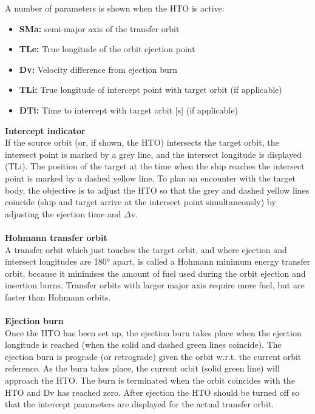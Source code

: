 \documentclass[Orbiter User Manual.tex]{subfiles}
\begin{document}
A number of parameters is shown when the HTO is active:
\begin{itemize}
\item \textbf{SMa:} semi-major axis of the transfer orbit
\item \textbf{TLe:} True longitude of the orbit ejection point
\item \textbf{Dv:} Velocity difference from ejection burn
\item \textbf{TLi:} True longitude of intercept point with target orbit (if applicable)
\item \textbf{DTi:} Time to intercept with target orbit [s] (if applicable)
\end{itemize}

\noindent
\textbf{Intercept indicator}\\
If the source orbit (or, if shown, the HTO) intersects the target orbit, the intersect point is marked by a grey line, and the intersect longitude is displayed (TLi). The position of the target at the time when the ship reaches the intersect point is marked by a dashed yellow line. To plan an encounter with the target body, the objective is to adjust the HTO so that the grey and dashed yellow lines coincide (ship and target arrive at the intersect point simultaneously) by adjusting the ejection time and $\Delta$v.\\
\\
\textbf{Hohmann transfer orbit}\\
A transfer orbit which just touches the target orbit, and where ejection and intersect longitudes are 180° apart, is called a Hohmann minimum energy transfer orbit, because it minimises the amount of fuel used during the orbit ejection and insertion burns. Transfer orbits with larger major axis require more fuel, but are faster than Hohmann orbits.\\
\\
\textbf{Ejection burn}\\
Once the HTO has been set up, the ejection burn takes place when the ejection longitude is reached (when the solid and dashed green lines coincide). The ejection burn is prograde (or retrograde) given the orbit w.r.t. the current orbit reference. As the burn takes place, the current orbit (solid green line) will approach the HTO. The burn is terminated when the orbit coincides with the HTO and Dv has reached zero. After ejection the HTO should be turned off so that the intercept parameters are displayed for the actual transfer orbit.\\
\\
\end{document}
